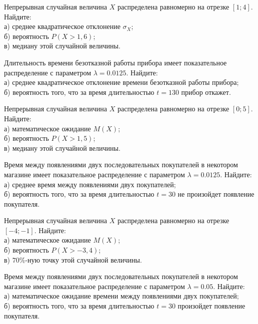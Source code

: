 \vfill

\newpage\setcounter{zad}{0}

\z Непрерывная случайная величина $X$ распределена равномерно на отрезке $[1; 4]$. Найдите: \\ \quad а) среднее квадратическое отклонение $\sigma_X$; \\ \quad б) вероятность $P(X>1{,}6)$; \\ \quad в) медиану этой случайной величины.


\vfill

\z Длительность времени безотказной работы прибора имеет показательное распределение с параметром $\lambda = 0.0125$. Найдите: \\ \quad а) среднее квадратическое отклонение времени безотказной работы прибора; \\ \quad б) вероятность того, что за время длительностью $t = 130$ прибор  откажет.
 

\vfill

\newpage\setcounter{zad}{0}

\z Непрерывная случайная величина $X$ распределена равномерно на отрезке $[0; 5]$. Найдите: \\ \quad а) математическое ожидание $M(X)$; \\ \quad б) вероятность $P(X>1{,}5)$; \\ \quad в) медиану этой случайной величины.


\vfill

\z Время между появлениями двух последовательных покупателей в некотором магазине имеет показательное распределение с параметром $\lambda = 0.0125$. Найдите: \\ \quad а) среднее время между появлениями двух покупателей; \\ \quad б) вероятность того, что за время длительностью $t = 30$ не произойдет появление покупателя.
 

\vfill

\newpage\setcounter{zad}{0}

\z Непрерывная случайная величина $X$ распределена равномерно на отрезке $[-4; -1]$. Найдите: \\ \quad а) математическое ожидание $M(X)$; \\ \quad б) вероятность $P(X>-3{,}4)$; \\ \quad в) $70\%$-ную точку этой случайной величины.


\vfill

\z Время между появлениями двух последовательных покупателей в некотором магазине имеет показательное распределение с параметром $\lambda = 0.05$. Найдите: \\ \quad а) математическое ожидание времени между появлениями двух покупателей; \\ \quad б) вероятность того, что за время длительностью $t = 30$  произойдет появление покупателя.
 

